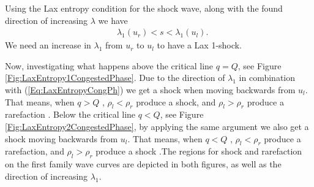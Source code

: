 \documentclass[10pt]{article}
\numberwithin{equation}{section}
\begin{document}
Using the Lax entropy condition for the shock wave, along with the found direction of increasing $\lambda$ we have \begin{align}
   &  \lambda_1 (u_r) < s < \lambda_1 (u_l).
   \label{Eq:LaxEntropyCongPh}
\end{align} We need an increase in $\lambda_1 $ from $u_r$ to $u_l$ to have a Lax 1-shock.

\begin{figure}
    \centering
    
\end{figure}

Now, investigating what happens above the critical line $ q = Q$, see Figure \ref{Fig:LaxEntropy1CongestedPhase}. Due to the direction of $\lambda_1$ in combination with (\ref{Eq:LaxEntropyCongPh}) we get a shock when moving backwards from $u_l$. That means, when $q > Q$ , $\rho_l < \rho_r$ produce a shock, and $\rho_l > \rho_r$ produce a rarefaction . Below the critical line $q < Q$, see Figure \ref{Fig:LaxEntropy2CongestedPhase}, by applying the same argument we also get a shock moving backwards from $u_l$. That means, when $q < Q$ , $\rho_l < \rho_r$ produce a rarefaction, and $\rho_l > \rho_r$ produce a shock .The regions for shock and rarefaction on the first family wave curves are depicted in both figures, as well as the direction of increasing $\lambda_1$. 

\end{document}
